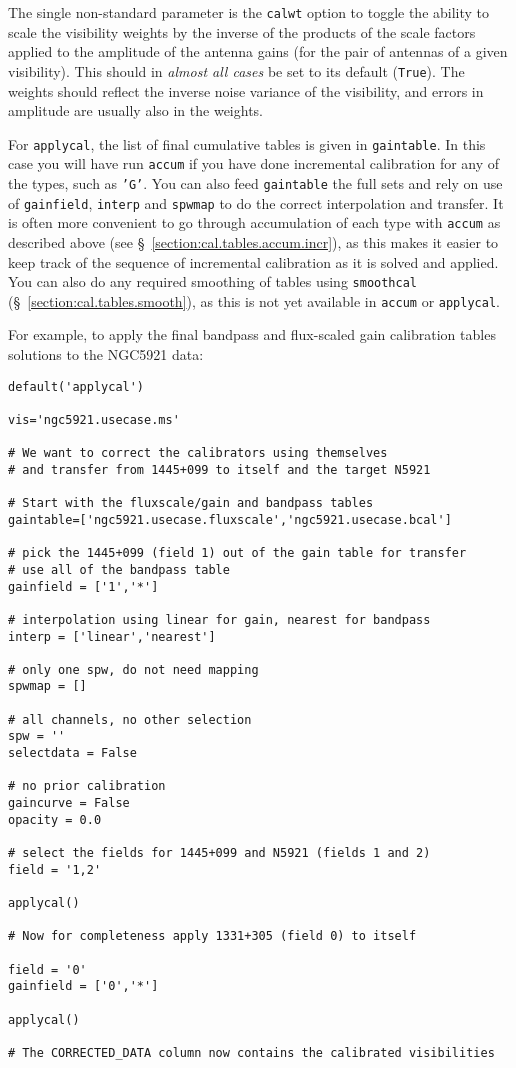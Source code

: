 The single non-standard parameter is the {\tt calwt} option to toggle
the ability to scale the visibility weights by the inverse of the 
products of the scale factors applied to the amplitude of the antenna
gains (for the pair of antennas of a given visibility).  
This should in {\em almost all cases} be set to its default ({\tt True}).
The weights should reflect the inverse noise variance of the
visibility, and errors in amplitude are usually also in the weights.

For {\tt applycal}, the list of final cumulative tables is given in 
{\tt gaintable}.  In this case you will have run {\tt accum} if you
have done incremental calibration for any of the types, such as {\tt 'G'}. 
You can also feed {\tt gaintable} the full sets and rely on use of
{\tt gainfield}, {\tt interp} and {\tt spwmap} to do the correct 
interpolation and transfer.  It is often more convenient to go through
accumulation of each type with {\tt accum} as described above
(see \S~\ref{section:cal.tables.accum.incr}), as this makes it easier
to keep track of the sequence of incremental calibration as it is
solved and applied.  You can also do any required smoothing of tables
using {\tt smoothcal} (\S~\ref{section:cal.tables.smooth}), as this
is not yet available in {\tt accum} or {\tt applycal}.

For example, to apply the final bandpass and flux-scaled gain
calibration tables solutions to the NGC5921 data:
\small
\begin{verbatim}
default('applycal')

vis='ngc5921.usecase.ms'

# We want to correct the calibrators using themselves
# and transfer from 1445+099 to itself and the target N5921

# Start with the fluxscale/gain and bandpass tables
gaintable=['ngc5921.usecase.fluxscale','ngc5921.usecase.bcal']
         
# pick the 1445+099 (field 1) out of the gain table for transfer
# use all of the bandpass table
gainfield = ['1','*']

# interpolation using linear for gain, nearest for bandpass
interp = ['linear','nearest']

# only one spw, do not need mapping
spwmap = []

# all channels, no other selection
spw = ''
selectdata = False

# no prior calibration
gaincurve = False
opacity = 0.0

# select the fields for 1445+099 and N5921 (fields 1 and 2)
field = '1,2'

applycal()

# Now for completeness apply 1331+305 (field 0) to itself

field = '0'
gainfield = ['0','*']

applycal()

# The CORRECTED_DATA column now contains the calibrated visibilities
\end{verbatim}
\normalsize

